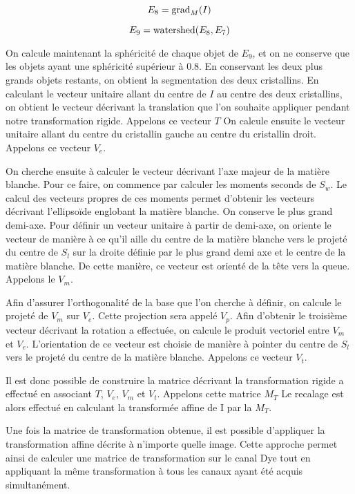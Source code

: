 \documentclass[\main/main.tex]{subfiles}
\begin{document}
\begin{equation}
    \label{eq:reg:crist:grad}
    E_8= \operatorname{\textnormal{grad}}_M(I)
\end{equation}

\begin{equation}
    \label{eq:reg:crist:water}
    E_9= \operatorname{\textnormal{watershed}}(E_8,E_7)
\end{equation}

%
On calcule maintenant la sphéricité de chaque objet de $E_9$, et on ne conserve que les objets ayant une sphéricité supérieur à $0.8$.
%
En conservant les deux plus grands objets restants, on obtient la segmentation des deux cristallins.
%
En calculant le vecteur unitaire allant du centre de $I$ au centre des deux cristallins, on obtient le vecteur décrivant la translation que l'on souhaite appliquer pendant notre transformation rigide. Appelons ce vecteur $T$
%
On calcule ensuite le vecteur unitaire allant du centre du cristallin gauche au centre du cristallin droit.
%
Appelons ce vecteur $V_e$.

%
On cherche ensuite à calculer le vecteur décrivant l'axe majeur de la matière blanche.
%
Pour ce faire, on commence par calculer les moments seconds de $S_w$.
%
Le calcul des vecteurs propres de ces moments permet d'obtenir les vecteurs décrivant l'ellipsoïde englobant la matière blanche.
%
On conserve le plus grand demi-axe.
%
Pour définir un vecteur unitaire à partir de demi-axe,
on oriente le vecteur de manière à ce qu'il aille du centre de la matière blanche vers le projeté du centre de $S_l$ sur la droite définie par le plus grand demi axe et le centre de la matière blanche.
%
De cette manière, ce vecteur est orienté de la tête vers la queue.
%
Appelons le $V_m$.

%
Afin d'assurer l'orthogonalité de la base que l'on cherche à définir, on calcule le projeté de $V_m$ sur $V_e$.
%
Cette projection sera appelé $V_p$.
%
Afin d'obtenir le troisième vecteur décrivant la rotation a effectuée, on calcule le produit vectoriel entre $V_m$ et $V_e$.
%
L'orientation de ce vecteur est choisie de manière à pointer du centre de $S_l$ vers le projeté du centre de la matière blanche.
%
Appelons ce vecteur $V_t$.

%
Il est donc possible de construire la matrice décrivant la transformation rigide a effectué en associant $T$, $V_e$, $V_m$ et $V_t$.
%
Appelons cette matrice $M_T$
%
Le recalage est alors effectué en calculant la transformée affine de I par la $M_T$.

%
Une fois la matrice de transformation obtenue, il est possible d'appliquer la transformation affine décrite à n'importe quelle image.
%
Cette approche permet ainsi de calculer une matrice de transformation sur le canal Dye tout en appliquant la même transformation à tous les canaux ayant été acquis simultanément.
\end{document}
